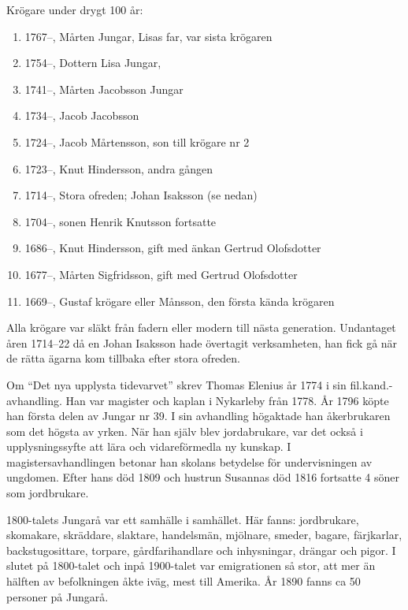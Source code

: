 Krögare under drygt 100 år:
\begin{enumerate}
  \item 1767--, Mårten Jungar, Lisas far, var sista krögaren
  \item 1754--, Dottern Lisa Jungar, 
  \item 1741--, Mårten Jacobsson Jungar
  \item 1734--, Jacob Jacobsson
  \item 1724--, Jacob Mårtensson, son till krögare nr 2
  \item 1723--, Knut Hindersson, andra gången
  \item 1714--, Stora ofreden; Johan Isaksson (se nedan)
  \item 1704--, sonen Henrik Knutsson fortsatte
  \item 1686--, Knut Hindersson, gift med änkan Gertrud Olofsdotter
  \item 1677--, Mårten Sigfridsson, gift med Gertrud Olofsdotter
  \item 1669--, Gustaf krögare eller Månsson, den första kända krögaren
\end{enumerate}
Alla krögare var släkt från fadern eller modern till nästa generation. Undantaget åren 1714--22 då en Johan Isaksson hade övertagit verksamheten, han fick gå när de rätta ägarna kom tillbaka efter stora ofreden.

Om ``Det nya upplysta tidevarvet'' skrev Thomas Elenius år 1774 i sin fil.kand.-avhandling. Han var magister och kaplan i Nykarleby från 1778. År 1796 köpte han första delen av Jungar nr 39. I sin avhandling högaktade han åkerbrukaren som det högsta av yrken. När han själv blev jordabrukare, var det också i upplysningssyfte att lära och vidareförmedla ny kunskap. I magistersavhandlingen betonar han skolans betydelse för undervisningen av ungdomen. Efter hans död 1809 och hustrun Susannas död 1816 fortsatte 4 söner som jordbrukare.

1800-talets Jungarå var ett samhälle i samhället. Här fanns: jordbrukare, skomakare, skräddare, slaktare, handelsmän, mjölnare, smeder, bagare, färjkarlar, backstugosittare, torpare, gårdfarihandlare och inhysningar, drängar och pigor. I slutet på 1800-talet och inpå 1900-talet var emigrationen så stor, att mer än hälften av befolkningen åkte iväg, mest till Amerika. År 1890 fanns ca 50 personer på Jungarå.

